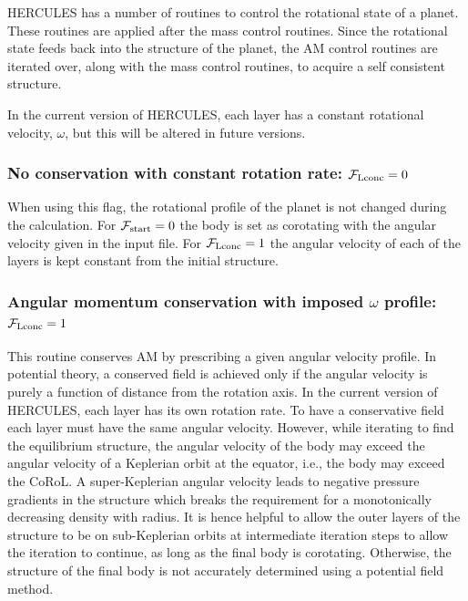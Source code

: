 \documentclass[11pt, oneside]{article}   	%
\begin{document}
HERCULES has a number of routines to control the rotational state of a planet. 
These routines are applied after the mass control routines.
Since the rotational state feeds back into the structure of the planet, the AM control routines are iterated over, along with the mass control routines, to acquire a self consistent structure.

\vspace{0.5cm}
\begin{tcolorbox}[colback=white, colframe=SchoolColor, title=Note]
In the current version of HERCULES, each layer has a constant rotational velocity, $\omega$, but this will be altered in future versions.
\end{tcolorbox}


\subsubsection{No conservation with constant rotation rate: $\mathcal{F}_{\rm Lconc}=0$}

When using this flag, the rotational profile of the planet is not changed during the calculation.
For $\mathcal{F}_{\rm start}=0$ the body is set as corotating with the angular velocity given in the input file.
For $\mathcal{F}_{\rm Lconc}=1$ the angular velocity of each of the layers is kept constant from the initial structure.


\subsubsection{Angular momentum conservation with imposed $\omega$ profile: $\mathcal{F}_{\rm Lconc}=1$}

This routine conserves AM by prescribing a given angular velocity profile. In potential theory, a conserved field is achieved only if the angular velocity is purely a function of distance from the rotation axis. In the current version of HERCULES, each layer has its own rotation rate. To have a conservative field each layer must have the same angular velocity. However, while iterating to find the equilibrium structure, the angular velocity of the body may exceed the angular velocity of a Keplerian orbit at the equator, i.e., the body may exceed the CoRoL. A super-Keplerian angular velocity leads to negative pressure gradients in the structure which breaks the requirement for a monotonically decreasing density with radius. It is hence helpful to allow the outer layers of the structure to be on sub-Keplerian orbits at intermediate iteration steps to allow the iteration to continue, as long as the final body is corotating. Otherwise, the structure of the final body is not accurately determined using a potential field method. 
\end{document}
